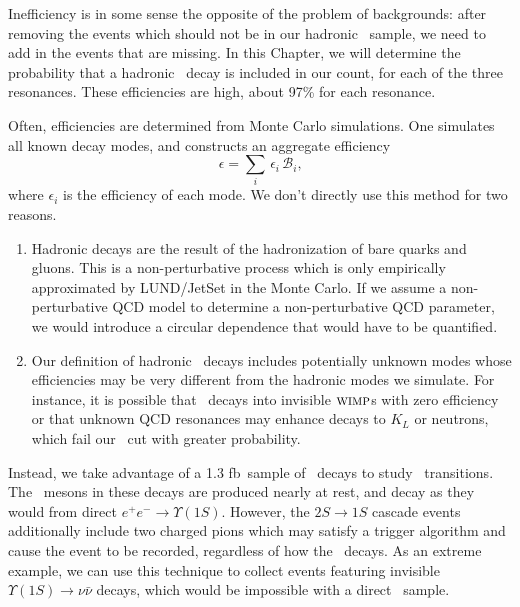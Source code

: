 \documentclass{cornell}
\begin{document}
Inefficiency is in some sense the opposite of the problem of
backgrounds: after removing the events which should not be in our
hadronic \ups\ sample, we need to add in the events that are missing.
In this Chapter, we will determine the probability that a hadronic
\ups\ decay is included in our count, for each of the three
resonances.  These efficiencies are high, about 97\% for each
resonance.

Often, efficiencies are determined from Monte Carlo simulations.  One
simulates all known decay modes, and constructs an aggregate efficiency
\begin{equation}
  \epsilon = \sum_i \, \epsilon_i \, {\mathcal B}_i \mbox{,}
  \label{eqn:agregate}
\end{equation}
where $\epsilon_i$ is the efficiency of each mode.  We don't directly
use this method for two reasons.
\begin{enumerate}

  \item Hadronic decays are the result of the hadronization of bare
    quarks and gluons.  This is a non-perturbative process which is
    only empirically approximated by LUND/JetSet in the Monte Carlo.
    If we assume a non-perturbative QCD model to determine a
    non-perturbative QCD parameter, we would introduce a circular
    dependence that would have to be quantified.

  \item Our definition of hadronic \ups\ decays includes potentially
    unknown modes whose efficiencies may be very different from the
    hadronic modes we simulate.  For instance, it is possible that
    \ups\ decays into invisible $\mbox{\sc wimp}$s with zero
    efficiency or that unknown QCD resonances may enhance decays to
    $K_L$ or neutrons, which fail our \visen\ cut with greater
    probability.

\end{enumerate}

Instead, we take advantage of a 1.3 fb\inv\ sample of \uss\ decays to
study \twotoone\ transitions.  The \us\ mesons in these decays are
produced nearly at rest, and decay as they would from direct $e^+e^-
\to \Upsilon(1S)$.  However, the $2S \to 1S$ cascade events
additionally include two charged pions which may satisfy a trigger
algorithm and cause the event to be recorded, regardless of how the
\us\ decays.  As an extreme example, we can use this technique to
collect events featuring invisible $\Upsilon(1S) \to \nu\bar{\nu}$
decays, which would be impossible with a direct \us\ sample.
\end{document}
